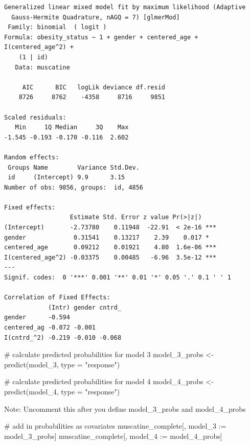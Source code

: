 \documentclass[
  letterpaper,
  DIV=11,
  numbers=noendperiod]{scrreprt}
\newenvironment{Shaded}{\begin{snugshade}}{\end{snugshade}}
\newcommand{\AttributeTok}[1]{\textcolor[rgb]{0.40,0.45,0.13}{#1}}
\newcommand{\CommentTok}[1]{\textcolor[rgb]{0.37,0.37,0.37}{#1}}
\newcommand{\ErrorTok}[1]{\textcolor[rgb]{0.68,0.00,0.00}{#1}}
\newcommand{\FunctionTok}[1]{\textcolor[rgb]{0.28,0.35,0.67}{#1}}
\newcommand{\NormalTok}[1]{\textcolor[rgb]{0.00,0.23,0.31}{#1}}
\newcommand{\OtherTok}[1]{\textcolor[rgb]{0.00,0.23,0.31}{#1}}
\newcommand{\SpecialCharTok}[1]{\textcolor[rgb]{0.37,0.37,0.37}{#1}}
\newcommand{\StringTok}[1]{\textcolor[rgb]{0.13,0.47,0.30}{#1}}
\begin{document}
\begin{verbatim}
Generalized linear mixed model fit by maximum likelihood (Adaptive
  Gauss-Hermite Quadrature, nAGQ = 7) [glmerMod]
 Family: binomial  ( logit )
Formula: obesity_status ~ 1 + gender + centered_age + I(centered_age^2) +  
    (1 | id)
   Data: muscatine

     AIC      BIC   logLik deviance df.resid 
    8726     8762    -4358     8716     9851 

Scaled residuals: 
   Min     1Q Median     3Q    Max 
-1.545 -0.193 -0.170 -0.116  2.602 

Random effects:
 Groups Name        Variance Std.Dev.
 id     (Intercept) 9.9      3.15    
Number of obs: 9856, groups:  id, 4856

Fixed effects:
                  Estimate Std. Error z value Pr(>|z|)    
(Intercept)       -2.73780    0.11948  -22.91  < 2e-16 ***
gender             0.31541    0.13217    2.39    0.017 *  
centered_age       0.09212    0.01921    4.80  1.6e-06 ***
I(centered_age^2) -0.03375    0.00485   -6.96  3.5e-12 ***
---
Signif. codes:  0 '***' 0.001 '**' 0.01 '*' 0.05 '.' 0.1 ' ' 1

Correlation of Fixed Effects:
            (Intr) gender cntrd_
gender      -0.594              
centered_ag -0.072 -0.001       
I(cntrd_^2) -0.219 -0.010 -0.068
\end{verbatim}

\begin{Shaded}
\begin{Highlighting}[]
\CommentTok{\# calculate predicted probabilities for model 3}
\NormalTok{model\_3\_probs }\OtherTok{\textless{}{-}} \FunctionTok{predict}\NormalTok{(model\_3, }\AttributeTok{type =} \StringTok{"response"}\NormalTok{)}

\CommentTok{\# calculate predicted probabilities for model 4}
\NormalTok{model\_4\_probs }\OtherTok{\textless{}{-}} \FunctionTok{predict}\NormalTok{(model\_4, }\AttributeTok{type =} \StringTok{"response"}\NormalTok{)}
\end{Highlighting}
\end{Shaded}

Note: Uncomment this after you define model\_3\_probs and
model\_4\_probs

\begin{Shaded}
\begin{Highlighting}[]
\CommentTok{\# add in probabilities as covariates}
\NormalTok{muscatine\_complete[, model\_3 }\SpecialCharTok{:}\ErrorTok{=}\NormalTok{ model\_3\_probs]}
\NormalTok{muscatine\_complete[, model\_4 }\SpecialCharTok{:}\ErrorTok{=}\NormalTok{ model\_4\_probs]}
\end{Highlighting}
\end{Shaded}
\end{document}
